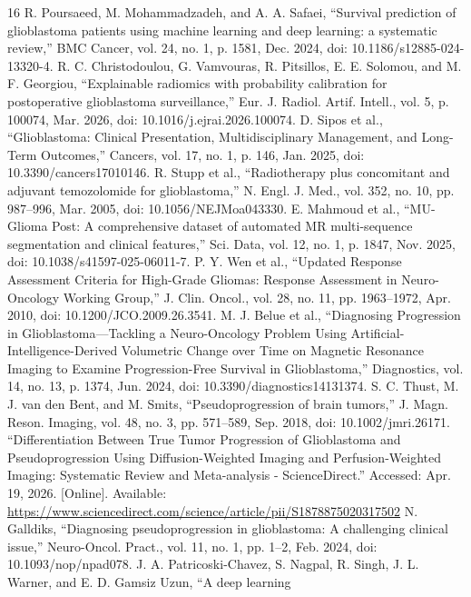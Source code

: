 \documentclass[letterpaper, 10pt, conference]{IEEEtran}
\begin{document}
\begin{thebibliography}{16}
 R. Poursaeed, M. Mohammadzadeh, and A. A. Safaei, ``Survival prediction of glioblastoma patients using
machine learning and deep learning: a systematic review,'' BMC Cancer, vol. 24, no. 1, p. 1581, Dec. 2024,
doi: 10.1186/s12885-024-13320-4.
 R. C. Christodoulou, G. Vamvouras, R. Pitsillos, E. E. Solomou, and M. F. Georgiou, ``Explainable
radiomics with probability calibration for postoperative glioblastoma surveillance,'' Eur. J. Radiol. Artif.
Intell., vol. 5, p. 100074, Mar. 2026, doi: 10.1016/j.ejrai.2026.100074.
 D. Sipos et al., ``Glioblastoma: Clinical Presentation, Multidisciplinary Management, and Long-Term
Outcomes,'' Cancers, vol. 17, no. 1, p. 146, Jan. 2025, doi: 10.3390/cancers17010146.
 R. Stupp et al., ``Radiotherapy plus concomitant and adjuvant temozolomide for glioblastoma,''
N. Engl. J. Med., vol. 352, no. 10, pp. 987--996, Mar. 2005, doi: 10.1056/NEJMoa043330.
 E. Mahmoud et al., ``MU-Glioma Post: A comprehensive dataset of automated MR multi-sequence segmentation
and clinical features,'' Sci. Data, vol. 12, no. 1, p. 1847, Nov. 2025, doi: 10.1038/s41597-025-06011-7.
 P. Y. Wen et al., ``Updated Response Assessment Criteria for High-Grade Gliomas: Response Assessment in
Neuro-Oncology Working Group,'' J. Clin. Oncol., vol. 28, no. 11, pp. 1963--1972, Apr. 2010, doi:
10.1200/JCO.2009.26.3541.
 M. J. Belue et al., ``Diagnosing Progression in Glioblastoma---Tackling a Neuro-Oncology Problem Using
Artificial-Intelligence-Derived Volumetric Change over Time on Magnetic Resonance Imaging to Examine
Progression-Free Survival in Glioblastoma,'' Diagnostics, vol. 14, no. 13, p. 1374, Jun. 2024, doi:
10.3390/diagnostics14131374.
 S. C. Thust, M. J. van den Bent, and M. Smits, ``Pseudoprogression of brain tumors,'' J. Magn.
Reson. Imaging, vol. 48, no. 3, pp. 571--589, Sep. 2018, doi: 10.1002/jmri.26171.
 ``Differentiation Between True Tumor Progression of Glioblastoma and Pseudoprogression Using
Diffusion-Weighted Imaging and Perfusion-Weighted Imaging: Systematic Review and Meta-analysis - ScienceDirect.''
Accessed: Apr. 19, 2026. [Online]. Available: \url{https://www.sciencedirect.com/science/article/pii/S1878875020317502}
 N. Galldiks, ``Diagnosing pseudoprogression in glioblastoma: A challenging clinical issue,''
Neuro-Oncol. Pract., vol. 11, no. 1, pp. 1--2, Feb. 2024, doi: 10.1093/nop/npad078.
 J. A. Patricoski-Chavez, S. Nagpal, R. Singh, J. L. Warner, and E. D. Gamsiz Uzun, ``A deep learning

\end{thebibliography}
\end{document}
